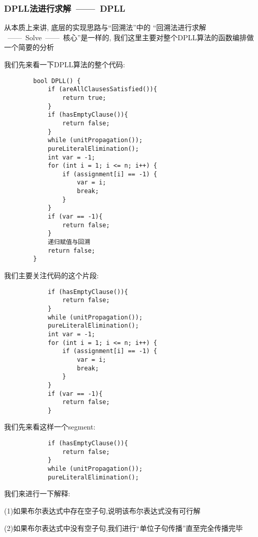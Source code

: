         \subsubsection{DPLL法进行求解\ ——\ DPLL}
            从本质上来讲,
            底层的实现思路与``回溯法''中的
            ``回溯法进行求解
            \ ——\ Solve\ ——\ 
            核心''是一样的,
            我们这里主要对整个DPLL算法的函数编排做一个简要的分析
            \par
            我们先来看一下DPLL算法的整个代码:
            \begin{lstlisting}
        bool DPLL() {
            if (areAllClausesSatisfied()){
                return true;
            }
            if (hasEmptyClause()){
                return false;
            }
            while (unitPropagation());
            pureLiteralElimination();
            int var = -1;
            for (int i = 1; i <= n; i++) {
                if (assignment[i] == -1) {
                    var = i;
                    break;
                }
            }
            if (var == -1){
                return false;
            }  
            递归赋值与回溯
            return false;
        }
            \end{lstlisting}
            \par
            我们主要关注代码的这个片段:
            \begin{lstlisting}
            if (hasEmptyClause()){
                return false;
            }
            while (unitPropagation());
            pureLiteralElimination();
            int var = -1;
            for (int i = 1; i <= n; i++) {
                if (assignment[i] == -1) {
                    var = i;
                    break;
                }
            }
            if (var == -1){
                return false;
            }
            \end{lstlisting}
            \par
            我们先来看这样一个segment:
            \begin{lstlisting}
            if (hasEmptyClause()){
                return false;
            }
            while (unitPropagation());
            pureLiteralElimination();
            \end{lstlisting}
            \noindent
            我们来进行一下解释:
            \par
            (1)如果布尔表达式中存在空子句,说明该布尔表达式没有可行解
            \par
            (2)如果布尔表达式中没有空子句,我们进行``单位子句传播''直至完全传播完毕
